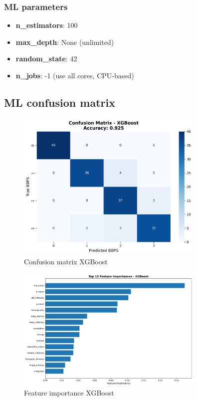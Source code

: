 \documentclass[11pt]{article}
\begin{document}
\subsubsection{ML parameters}
\begin{itemize}
    \item \textbf{n\_estimators}: 100
    \item \textbf{max\_depth}: None (unlimited)
    \item \textbf{random\_state}: 42
    \item \textbf{n\_jobs}: -1 (use all cores, CPU-based)
\end{itemize}

\subsection{ML confusion matrix}
\begin{figure}[H]
\centering
\includegraphics[width=0.8\textwidth]{images/confusion_matrix_xgboost}
\caption{Confusion matrix XGBoost}
\label{fig:confusion_matrix_xgboost}
\end{figure}

\begin{figure}[H]
\centering
\includegraphics[width=0.8\textwidth]{images/feature_importance_xgboost}
\caption{Feature importance XGBoost}
\label{fig:feature_importance_xgboost}
\end{figure}
\end{document}
